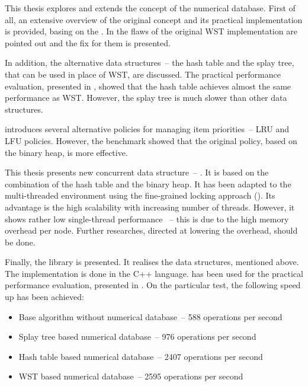 This thesis explores and extends the concept of the numerical database. First of all, an extensive overview of the original concept and its practical implementation is provided, basing on the \cite{park90}. In  the flaws of the original WST implementation are pointed out and the fix for them is presented.

In addition, the alternative data structures~-- the hash table and the splay tree, that can be used in place of WST, are discussed. The practical performance evaluation, presented in , showed that the hash table achieves almost the same performance as WST. However, the splay tree is much slower than other data structures.

 introduces several alternative policies for managing item priorities~-- LRU and LFU policies. However, the benchmark showed that the original policy, based on the binary heap, is more effective.

This thesis presents new concurrent data structure~-- \cndcname.
It is based on the combination of the hash table and the binary heap. It has been adapted to the multi-threaded environment using the fine-grained locking approach (). Its advantage is the high scalability with increasing number of threads. However, it shows rather low single-thread performance ~-- this is due to the high memory overhead per node. Further researches, directed at lowering the overhead, should be done.

Finally, the \numdbname library is presented. It realises the data structures, mentioned above. The implementation is done in the C++ language. \numdbname has been used for the practical performance evaluation, presented in . On the particular test, the following speed up has been achieved:

\pagebreak

\begin{itemize}
\item[] Base algorithm without numerical database~-- 588 operations per second
\item[] Splay tree based numerical database~-- 976 operations per second
\item[] Hash table based numerical database~-- 2407 operations per second
\item[] WST based numerical database~-- 2595 operations per second
\end{itemize}
